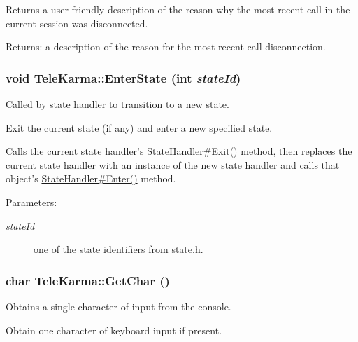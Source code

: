 Returns a user-friendly description of the reason why the most recent call in the current session was disconnected. 

\begin{Desc}
\item[Returns:]a description of the reason for the most recent call disconnection. \end{Desc}
\hypertarget{classTeleKarma_22107597af9789cf4162ac2bb32f0482}{
\subsubsection[{EnterState}]{\setlength{\rightskip}{0pt plus 5cm}void TeleKarma::EnterState (int {\em stateId})}}
\label{classTeleKarma_22107597af9789cf4162ac2bb32f0482}


Called by state handler to transition to a new state. 

Exit the current state (if any) and enter a new specified state.

Calls the current state handler's \hyperlink{classStateHandler_5ce0f2cb3d4a9f5aca137d47eac75c1e}{StateHandler\#Exit()} method, then replaces the current state handler with an instance of the new state handler and calls that object's \hyperlink{classStateHandler_c08036e743cf5172d6931cf3b6d321c6}{StateHandler\#Enter()} method. \begin{Desc}
\item[Parameters:]
\begin{description}
\item[{\em stateId}]one of the state identifiers from \hyperlink{state_8h-source}{state.h}. \end{description}
\end{Desc}
\hypertarget{classTeleKarma_5dd175d49c7a2f9f36ff9c3c7c34d230}{
\subsubsection[{GetChar}]{\setlength{\rightskip}{0pt plus 5cm}char TeleKarma::GetChar ()}}
\label{classTeleKarma_5dd175d49c7a2f9f36ff9c3c7c34d230}


Obtains a single character of input from the console. 

Obtain one character of keyboard input if present.

